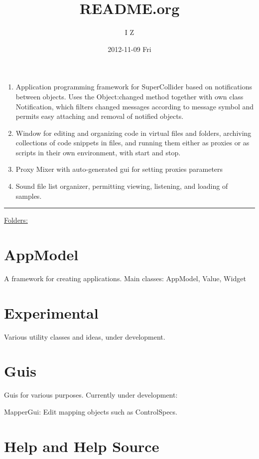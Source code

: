 \documentclass[11pt, a4paper]{scrartcl}
\begin{document}
\title{README.org}
\author{I Z}
\date{2012-11-09 Fri}
\maketitle

\setcounter{tocdepth}{3}
\tableofcontents
\vspace*{1cm}

\begin{enumerate}
\item Application programming framework for SuperCollider based on notifications between objects. Uses the Object:changed method together with own class Notification, which filters changed messages according to message symbol and permits easy attaching and removal of notified objects.
\item Window for editing and organizing code in virtual files and folders, archiving collections of code snippets in files, and running them either as proxies or as scripts in their own environment, with start and stop.
\item Proxy Mixer with auto-generated gui for setting proxies parameters
\item Sound file list organizer, permitting viewing, listening, and loading of samples.
\end{enumerate}

\hrule

\underline{Folders:}

\section{AppModel}
\label{sec-1}


A framework for creating applications. Main classes:
AppModel, Value, Widget
\section{Εxperimental}
\label{sec-2}


Various utility classes and ideas, under development.
\section{Guis}
\label{sec-3}


Guis for various purposes. Currently under development: 

MapperGui: Edit mapping objects such as ControlSpecs. 
\section{Help and Help Source}
\label{sec-4}
\end{document}

